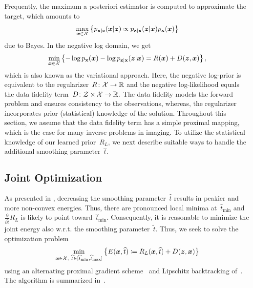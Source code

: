 \documentclass[nohyperref]{article}
\newcommand{\X}{\mathcal{X}}
\newcommand{\Z}{\mathcal{Z}}
\def\hatt{{\widehat{t}}}
\newcommand{\tminh}{\hatt_\mathrm{min}}
\newcommand{\tmaxh}{\hatt_\mathrm{max}}
\newcommand{\pdf}[1]{p_{#1}}
\theoremstyle{plain}
\theoremstyle{definition}
\theoremstyle{remark}
\begin{document}
Frequently, the maximum a posteriori estimator is computed to approximate the target, which amounts to
\[
\max_{\vx\in\X}\left\{\pdf{\rvx\vert\rvz}(\vx\vert\vz)\propto \pdf{\rvz\vert\rvx}(\vz\vert\vx)\pdf{\rvx}(\vx)\right\}
\]
due to Bayes.
In the negative log domain, we get
\[
\min_{\vx\in\X}\left\{ -\log\pdf{\rvx}(\vx) -\log\pdf{\rvz\vert\rvx}(\vz\vert\vx) = R(\vx) + D(\vz,\vx)\right\},
\]
which is also known as the variational approach.
Here, the negative log-prior is equivalent to the regularizer~$R\colon\X\to\R$ and the negative log-likelihood equals the data fidelity term~$D\colon\Z\times\X\to\R$.
The data fidelity models the forward problem and ensures consistency to the observations, whereas, the regularizer incorporates prior (statistical) knowledge of the solution.
Throughout this section, we assume that the data fidelity term has a simple proximal mapping, which is the case for many inverse problems in imaging.
To utilize the statistical knowledge of our learned prior~$R_L$, we next describe suitable ways to handle the additional smoothing parameter~$\widehat{t}$.

\subsection{Joint Optimization} \label{sec:jointOptimization}
As presented in , decreasing the smoothing parameter~$\widehat{t}$ results in peakier and more non-convex energies.
Thus, there are pronounced local minima at~$\tminh$ and $\frac{\partial}{\partial\widetilde{t}}R_L$ is likely to point toward~$\tminh$.
Consequently, it is reasonable to minimize the joint energy also w.r.t. the smoothing parameter~$\widetilde{t}$.
Thus, we seek to solve the optimization problem
\begin{align} \label{eq:jointEnergy}
\min_{\vx\in\X,\ \widehat{t}\in[\tminh,\tmaxh]} \left\{E(\vx,\widehat{t})\coloneqq R_L(\vx,\widehat{t}) + D(\vz,\vx)\right\}
\end{align}
using an alternating proximal gradient scheme~\citep{BoSa14} and Lipschitz backtracking of~\citet{BeTe09}.
The algorithm is summarized in~.
\end{document}
